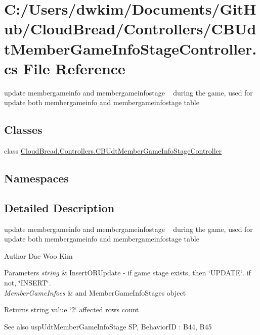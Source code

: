 \hypertarget{a00158}{}\section{C\+:/\+Users/dwkim/\+Documents/\+Git\+Hub/\+Cloud\+Bread/\+Controllers/\+C\+B\+Udt\+Member\+Game\+Info\+Stage\+Controller.cs File Reference}
\label{a00158}


update membergameinfo and membergameinfostage ~\newline
during the game, used for update both membergameinfo and membergameinfostage table ~\newline
 


\subsection*{Classes}
\begin{DoxyCompactItemize}
\item 
class \hyperlink{a00045}{Cloud\+Bread.\+Controllers.\+C\+B\+Udt\+Member\+Game\+Info\+Stage\+Controller}
\end{DoxyCompactItemize}
\subsection*{Namespaces}
\begin{DoxyCompactItemize}
\end{DoxyCompactItemize}


\subsection{Detailed Description}
update membergameinfo and membergameinfostage ~\newline
during the game, used for update both membergameinfo and membergameinfostage table ~\newline


\begin{DoxyAuthor}{Author}
Dae Woo Kim 
\end{DoxyAuthor}

\begin{DoxyParams}{Parameters}
{\em string} & Insert\+O\+R\+Update -\/ if game stage exists, then \char`\"{}\+U\+P\+D\+A\+T\+E\char`\"{}. if not, \char`\"{}\+I\+N\+S\+E\+R\+T\char`\"{}. \\
\hline
{\em Member\+Game\+Infoes} & and Member\+Game\+Info\+Stages object \\
\hline
\end{DoxyParams}
\begin{DoxyReturn}{Returns}
string value \char`\"{}2\char`\"{} affected rows count 
\end{DoxyReturn}
\begin{DoxySeeAlso}{See also}
usp\+Udt\+Member\+Game\+Info\+Stage SP, Behavior\+ID \+: B44, B45 
\end{DoxySeeAlso}
